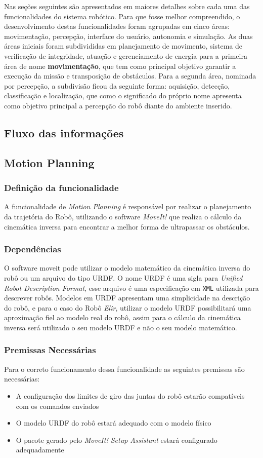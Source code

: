 Nas seções seguintes são apresentados em maiores detalhes sobre cada uma das funcionalidades do sistema robótico. Para que fosse melhor compreendido, o desenvolvimento destas funcionalidades foram agrupadas em cinco áreas: movimentação, percepção, interface do usuário, autonomia e simulação. As duas áreas iniciais foram subdivididas em planejamento de movimento, sistema de verificação de integridade, atuação e gerenciamento de energia para a primeira área de nome \textbf{movimentação}, que tem como principal objetivo garantir a execução da missão e transposição de obstáculos. Para a segunda área, nominada por percepção, a subdivisão ficou da seguinte forma: aquisição, detecção, classificação e localização, que como o significado do próprio nome apresenta como objetivo principal a percepção do robô diante do ambiente inserido.

\subsection{Fluxo das informações}
\label{ssec:fluxo}


\subsection{Motion Planning}
\label{ssec:motion}
\subsubsection{Definição da funcionalidade}
A funcionalidade de \textit{Motion Planning} é responsável por realizar o planejamento da trajetória do Robô, utilizando o software \textit{MoveIt!} que realiza o cálculo da cinemática inversa para encontrar a melhor forma de ultrapassar os obstáculos.
\subsubsection{Dependências}
O software moveit pode utilizar o modelo matemático da cinemática inversa do robô ou um arquivo do tipo URDF.
O nome URDF é uma sigla para \textit{Unified Robot Description Format}, esse arquivo é uma especificação em \verb|XML| utilizada para descrever robôs. Modelos em URDF apresentam uma simplicidade na descrição do robô, e para o caso do Robô \textit{Elir}, utilizar o modelo URDF possibilitará uma aproximação fiel ao modelo real do robô, assim para o cálculo da cinemática inversa será utilizado o seu modelo URDF e não o seu modelo matemático.

\subsubsection{Premissas Necessárias}
Para o correto funcionamento dessa funcionalidade as seguintes premissas são necessárias:
\begin{itemize}
	\item A configuração dos limites de giro das juntas do robô estarão compatíveis com os comandos enviados
	\item O modelo URDF do robô estará adequado com o modelo físico
	\item O pacote gerado pelo \textit{MoveIt! Setup Assistant} estará configurado adequadamente
\end{itemize}
